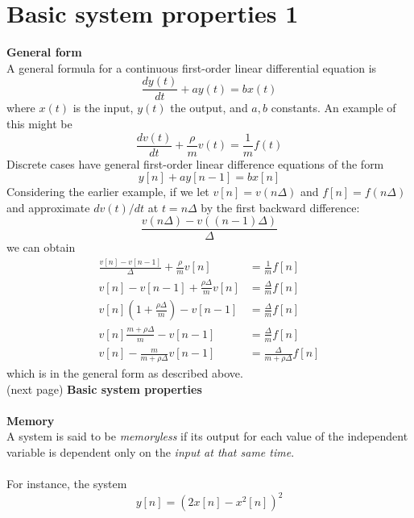 \documentclass{report}
\begin{document}
\section{Basic system properties 1}
\textbf{General form}\\
A general formula for a continuous first-order linear differential equation is
\begin{equation*}
\frac{dy(t)}{dt}+ay(t)=bx(t)
\end{equation*}
where $x(t)$ is the input, $y(t)$ the output, and $a,b$ constants. An example of this might be
\begin{equation*}
\frac{dv(t)}{dt}+\frac{\rho}{m}v(t)=\frac{1}{m}f(t)
\end{equation*}
Discrete cases have general first-order linear difference equations of the form
\begin{equation*}
y[n]+ay[n-1]=bx[n]
\end{equation*}
Considering the earlier example, if we let $v[n]=v(n\Delta)$ and $f[n]=f(n\Delta)$ and approximate $dv(t)/dt$ at $t=n\Delta$ by
the first backward difference:
\begin{equation*}
\frac{v(n\Delta)-v((n-1)\Delta)}{\Delta}
\end{equation*}
we can obtain
\begin{align*}
\frac{v[n]-v[n-1]}{\Delta}+\frac{\rho}{m}v[n]&=\frac{1}{m}f[n]\\
v[n]-v[n-1]+\frac{\rho\Delta}{m}v[n]&=\frac{\Delta}{m}f[n]\\
v[n]\left(1+\frac{\rho\Delta}{m}\right)-v[n-1]&=\frac{\Delta}{m}f[n]\\
v[n]\frac{m+\rho\Delta}{m}-v[n-1]&=\frac{\Delta}{m}f[n]\\
v[n]-\frac{m}{m+\rho\Delta}v[n-1]&=\frac{\Delta}{m+\rho\Delta}f[n]
\end{align*}
which is in the general form as described above.\\
(next page)\newpage
\noindent\textbf{Basic system properties}\\
\vspace{1mm}\\
\textbf{Memory}\\
A system is said to be \textit{memoryless} if its output for each value of the independent variable is dependent
only on the \textit{input at that same time}.\\
\vspace{1mm}\\
For instance, the system 
\begin{equation*}
y[n]=(2x[n]-x^2[n])^2
\end{equation*}
\end{document}
